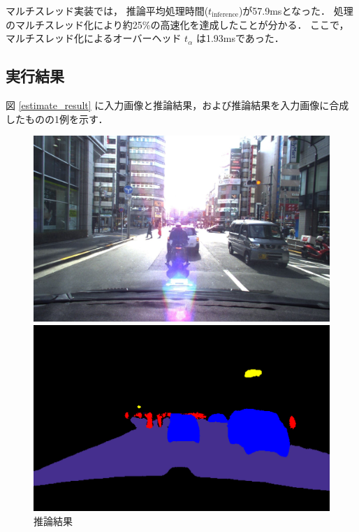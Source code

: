 マルチスレッド実装では，
推論平均処理時間($t_{\mathrm{inference}}$)が57.9msとなった．
処理のマルチスレッド化により約25\%の高速化を達成したことが分かる．
ここで，マルチスレッド化によるオーバーヘッド $t_\alpha$ は1.93msであった．

\subsection{実行結果}

図 \ref{estimate_result} に入力画像と推論結果，および推論結果を入力画像に合成したものの1例を示す．

\begin{figure}[h]
  \begin{center}
    \caption{推論結果}
    \begin{minipage}{0.32\hsize}
      \begin{center}
        \includegraphics[width=\linewidth]{./figures/orig.jpg}
      \end{center}
    \end{minipage}
    \begin{minipage}{0.32\hsize}
      \begin{center}
        \includegraphics[width=\linewidth]{./figures/label.png}

\end{center}
\end{minipage}
\end{center}
\end{figure}
